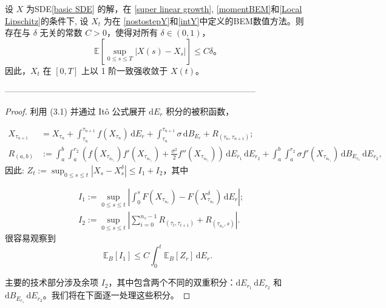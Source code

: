 \begin{theorem}\label{main th BEM1}
	设 $X$ 为SDE\textnormal{\cref{basic SDE} }的解，在 \textnormal{\cref{super linear growth}}, \textnormal{\cref{momentBEM}}和\textnormal{\cref{Local Lipschitz}}的条件下, 
	设 $X_t$ 为在 \textnormal{\cref{nostostepY}}和\textnormal{\cref{intY}}中定义的BEM数值方法。则存在与 $\delta$ 无关的常数 $C > 0$，使得对所有 $\delta \in (0,1)$，
	\[
	\mathbb{E} \left[ \sup_{0 \leq s \leq T} | X(s) - X_s | \right] \leq C \delta。
	\]
	因此，$X_t$ 在 $[0, T]$ 上以 1 阶一致强收敛于 $X(t)$。
\end{theorem}

-----------------------------------------------------------------------------------------

\begin{proof}
	
	利用 (3.1) 并通过 Itô 公式展开 $\mathrm{d}E_r$ 积分的被积函数，
	
	$$
	\begin{aligned}
		X_{\tau_{n+1}} &= X_{\tau_n} +  \int_{\tau_n}^{\tau_{n+1}} f(X_{\tau_n}) \, \mathrm{d}E_r + \int_{\tau_n}^{\tau_{n+1}} \sigma \, \mathrm{d}B_{E_r} + R_{(\tau_n, \tau_{n+1})}; \\
		R_{(a,b)} &:=  \int_a^b \int_a^{r_2} \left( f(X_{\tau_{n_{r_1}}})f'(X_{\tau_{n_{r_1}}}) + \frac{\sigma ^2}{2} f''(X_{\tau_{n_{r_1}}})  \right) \, \mathrm{d}E_{r_1} \, \mathrm{d}E_{r_2} + \int_a^b \int_a^{r_2} \sigma f'(X_{\tau_{n_{r_1}}})   \, \mathrm{d}B_{E_{r_1}} \, \mathrm{d}E_{r_2},
	\end{aligned}
	$$
	因此:
	$Z_t := \sup_{0 \leq s \leq t} | X_s - {X_s^\delta} | \leq I_1 + I_2 $，其中
	
	$$
	\begin{aligned}
		&I_1 := \sup_{0 \leq s \leq t} \left| \int_0^s F(X_{\tau_{n_r}}) - F(X_{\tau_{n_r}}^\delta)  \, \mathrm{d}E_r \right|; \\
		&I_2 := \sup_{0 \leq s \leq t} \left| \sum_{i=0}^{n_s - 1} R_{(\tau_{t}, \tau_{t+1})} + R_{(\tau_{n_s}, s)} \right|.
	\end{aligned}
	$$
	很容易观察到
	\begin{equation}\label{II1}
		\mathbb{E}_B[I_1] \leq C \int_0^t \mathbb{E}_B[Z_r] \, \mathrm{d}E_r.
	\end{equation}
	
	主要的技术部分涉及余项 $I_2$，其中包含两个不同的双重积分：$\mathrm{d}E_{r_1} \, \mathrm{d}E_{r_2}$ 和 $\mathrm{d}B_{E_{r_1}} \, \mathrm{d}E_{r_2}$。我们将在下面逐一处理这些积分。
	

\end{proof}
